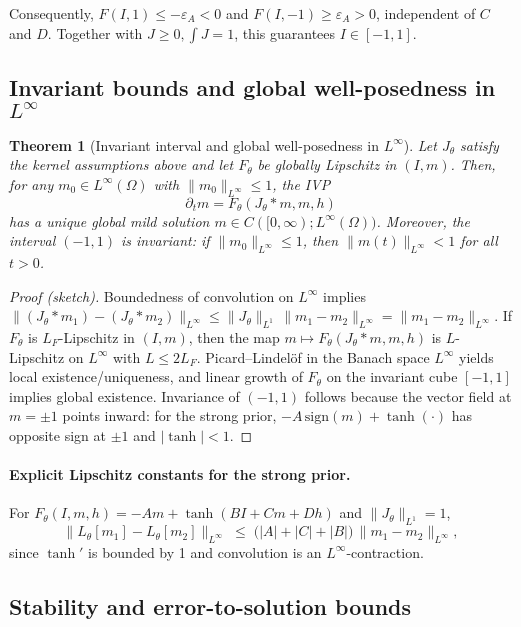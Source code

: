 \documentclass[11pt,a4paper]{article}
\theoremstyle{plain}
\newtheorem{theorem}{Theorem}[section]
\theoremstyle{definition}
\theoremstyle{remark}
\begin{document}
Consequently,
$F(I,1)\le -\varepsilon_A<0$ and $F(I,-1)\ge \varepsilon_A>0$, independent of $C$ and $D$.
Together with $J\ge 0,\int J=1$, this guarantees $I\in[-1,1]$.

\subsection{Invariant bounds and global well-posedness in $L^\infty$}
\label{subsec:inv_wellposed}

\begin{theorem}[Invariant interval and global well-posedness in $L^\infty$]
	\label{thm:linfty_wellposed}
	Let $J_\theta$ satisfy the kernel assumptions above and let $F_\theta$ be globally Lipschitz in $(I,m)$. Then, for any $m_0\in L^\infty(\Omega)$ with $\|m_0\|_{L^\infty}\le 1$, the IVP
	\[
		\partial_t m = F_\theta(J_\theta*m, m, h)
	\]
	has a unique global mild solution $m\in C([0,\infty);L^\infty(\Omega))$. Moreover, the interval $(-1,1)$ is invariant: if $\|m_0\|_{L^\infty}\le 1$, then $\|m(t)\|_{L^\infty}<1$ for all $t>0$.
\end{theorem}

\begin{proof}[Proof (sketch)]
	Boundedness of convolution on $L^\infty$ implies
	\(
	\| (J_\theta*m_1) - (J_\theta*m_2) \|_{L^\infty} \le \|J_\theta\|_{L^1}\, \|m_1-m_2\|_{L^\infty} = \|m_1-m_2\|_{L^\infty}.
	\)
	If $F_\theta$ is $L_F$-Lipschitz in $(I,m)$, then the map $m\mapsto F_\theta(J_\theta*m,m,h)$ is $L$-Lipschitz on $L^\infty$ with $L\le 2L_F$. Picard--Lindel\"of in the Banach space $L^\infty$ yields local existence/uniqueness, and linear growth of $F_\theta$ on the invariant cube $[-1,1]$ implies global existence. Invariance of $(-1,1)$ follows because the vector field at $m=\pm 1$ points inward: for the strong prior, $-A\,\mathrm{sign}(m)+\tanh(\cdot)$ has opposite sign at $\pm1$ and $|\tanh|<1$.
\end{proof}

\paragraph{Explicit Lipschitz constants for the strong prior.}
For $F_\theta(I,m,h)=-A m + \tanh(B I + C m + D h)$ and $\|J_\theta\|_{L^1}=1$,
\[
	\| L_\theta[m_1]-L_\theta[m_2] \|_{L^\infty}
	\;\le\; \Big(|A|+|C| + |B|\Big)\,\|m_1-m_2\|_{L^\infty},
\]
since $\tanh'$ is bounded by 1 and convolution is an $L^\infty$-contraction.

\subsection{Stability and error-to-solution bounds}
\label{subsec:stability_error}
\end{document}
